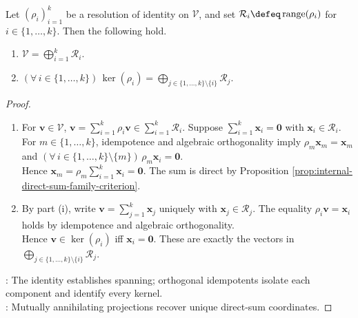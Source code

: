 \begin{theorem} \label{thm:resolution-of-identity-gives-direct-sum} \\
Let $(\rho_i)_{i=1}^{k}$ be a resolution of identity on $\mathcal{V}$, and set $\mathcal{R}_i\defeq\operatorname{range}(\rho_i)$ for $i\in\{1,\ldots,k\}$. Then the following hold.
\begin{enumerate}[label=(\roman*)]
\setlength{\itemsep}{0pt}
\item $\mathcal{V}=\bigoplus\limits_{i=1}^{k}\mathcal{R}_i$.
\item $(\forall\,i\in\{1,\ldots,k\})\,\ker(\rho_i)=\bigoplus\limits_{j\in\{1,\ldots,k\}\setminus\{i\}}\mathcal{R}_j$.
\end{enumerate}
\begin{proof}
\begin{enumerate}[label=(\roman*)]
\setlength{\itemsep}{0pt}
\item For $\mathbf{v}\in\mathcal{V}$, $\mathbf{v}=\sum\limits_{i=1}^{k}\rho_i\mathbf{v}\in\sum\limits_{i=1}^{k}\mathcal{R}_i$. Suppose $\sum\limits_{i=1}^{k}\mathbf{x}_i=\mathbf{0}$ with $\mathbf{x}_i\in\mathcal{R}_i$.\\
For $m\in\{1,\ldots,k\}$, idempotence and algebraic orthogonality imply $\rho_m\mathbf{x}_m=\mathbf{x}_m$ and $(\forall\,i\in\{1,\ldots,k\}\setminus\{m\})\,\rho_m\mathbf{x}_i=\mathbf{0}$.\\
Hence $\mathbf{x}_m=\rho_m\sum\limits_{i=1}^{k}\mathbf{x}_i=\mathbf{0}$. The sum is direct by Proposition \ref{prop:internal-direct-sum-family-criterion}.
\item By part (i), write $\mathbf{v}=\sum\limits_{j=1}^{k}\mathbf{x}_j$ uniquely with $\mathbf{x}_j\in\mathcal{R}_j$. The equality $\rho_i\mathbf{v}=\mathbf{x}_i$ holds by idempotence and algebraic orthogonality.\\
Hence $\mathbf{v}\in\ker(\rho_i)$ iff $\mathbf{x}_i=\mathbf{0}$. These are exactly the vectors in $\bigoplus\limits_{j\in\{1,\ldots,k\}\setminus\{i\}}\mathcal{R}_j$.
\end{enumerate}
: The identity establishes spanning; orthogonal idempotents isolate each component and identify every kernel.\\
: Mutually annihilating projections recover unique direct-sum coordinates.
\end{proof}
\end{theorem}

